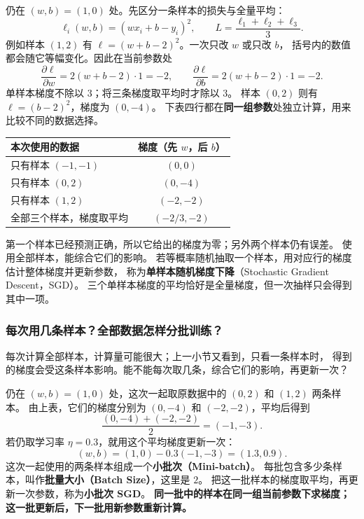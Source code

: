 仍在 $(w,b)=(1,0)$ 处。先区分一条样本的损失与全量平均：
\[
\ell_i(w,b)=(wx_i+b-y_i)^2,\qquad L=\frac{\ell_1+\ell_2+\ell_3}{3}.
\]
例如样本 $(1,2)$ 有 $\ell=(w+b-2)^2$。一次只改 $w$ 或只改 $b$，
括号内的数值都会随它等幅变化。因此在当前参数处
\[
\frac{\partial\ell}{\partial w}=2(w+b-2)\cdot1=-2,\qquad
\frac{\partial\ell}{\partial b}=2(w+b-2)\cdot1=-2.
\]
单样本梯度不除以 $3$；将三条梯度取平均时才除以 $3$。
样本 $(0,2)$ 则有 $\ell=(b-2)^2$，梯度为 $(0,-4)$。
下表四行都在\textbf{同一组参数}处独立计算，用来比较不同的数据选择。
\begin{center}
\begin{tabular}{lc}
\toprule
本次使用的数据 & 梯度（先 $w$，后 $b$）\\\midrule
只有样本 $(-1,-1)$ & $(0,0)$\\
只有样本 $(0,2)$ & $(0,-4)$\\
只有样本 $(1,2)$ & $(-2,-2)$\\
全部三个样本，梯度取平均 & $(-2/3,-2)$\\
\bottomrule
\end{tabular}
\end{center}
第一个样本已经预测正确，所以它给出的梯度为零；另外两个样本仍有误差。
使用全部样本，能综合它们的影响。
若等概率随机抽取一个样本，用对应行的梯度估计整体梯度并更新参数，
称为\textbf{单样本随机梯度下降}（Stochastic Gradient Descent，SGD）。
三个单样本梯度的平均恰好是全量梯度，但一次抽样只会得到其中一项。

\subsubsection{每次用几条样本？全部数据怎样分批训练？}

每次计算全部样本，计算量可能很大；上一小节又看到，只看一条样本时，
得到的梯度会受这条样本影响。能不能每次取几条，综合它们的影响，再更新一次？

仍在 $(w,b)=(1,0)$ 处，这次一起取原数据中的 $(0,2)$ 和 $(1,2)$ 两条样本。
由上表，它们的梯度分别为 $(0,-4)$ 和 $(-2,-2)$，平均后得到
\[
\frac{(0,-4)+(-2,-2)}{2}=(-1,-3).
\]
若仍取学习率 $\eta=0.3$，就用这个平均梯度更新一次：
\[
(w,b)=(1,0)-0.3(-1,-3)=(1.3,0.9).
\]
\label{concept:mini-batch}
这次一起使用的两条样本组成一个\textbf{小批次（Mini-batch）}。
\label{concept:batch-size}
每批包含多少条样本，叫作\textbf{批量大小（Batch Size）}，这里是 $2$。
把这一批样本的梯度取平均，再更新一次参数，称为\textbf{小批次 SGD}。
\textbf{同一批中的样本在同一组当前参数下求梯度；这一批更新后，下一批用新参数重新计算。}

